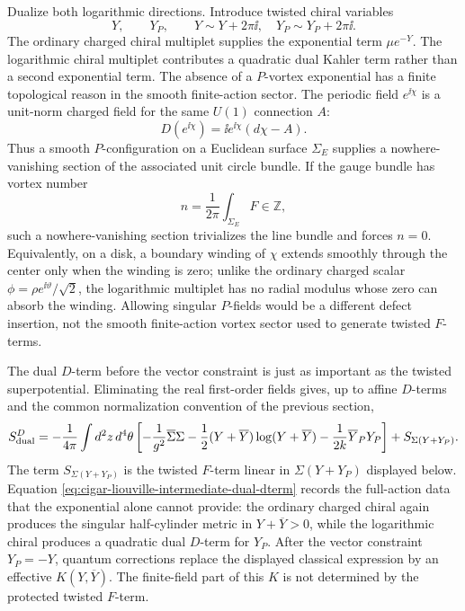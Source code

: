 Dualize both logarithmic directions.  Introduce twisted chiral variables
\[
  Y,\qquad Y_P,
  \qquad
  Y\sim Y+2\pi\ii,\quad Y_P\sim Y_P+2\pi\ii .
\]
The ordinary charged chiral multiplet supplies the exponential term
\(\mu e^{-Y}\).  The logarithmic chiral multiplet contributes a quadratic
dual Kahler term rather than a second exponential term.  The absence of a
\(P\)-vortex exponential has a finite topological reason in the smooth
finite-action sector.  The periodic field \(e^{\ii\chi}\) is a unit-norm
charged field for the same \(U(1)\) connection \(A\):
\[
  D(e^{\ii\chi})
  =
  \ii e^{\ii\chi}(d\chi-A).
\]
Thus a smooth \(P\)-configuration on a Euclidean surface \(\Sigma_E\)
supplies a nowhere-vanishing section of the associated unit circle bundle.
If the gauge bundle has vortex number
\[
  n=\frac{1}{2\pi}\int_{\Sigma_E}F\in\mathbb Z ,
\]
such a nowhere-vanishing section trivializes the line bundle and forces
\(n=0\).  Equivalently, on a disk, a boundary winding of \(\chi\) extends
smoothly through the center only when the winding is zero; unlike the
ordinary charged scalar \(\phi=\rho e^{\ii\vartheta}/\sqrt2\), the
logarithmic multiplet has no radial modulus whose zero can absorb the
winding.  Allowing singular \(P\)-fields would be a different defect
insertion, not the smooth finite-action vortex sector used to generate
twisted \(F\)-terms.

The dual \(D\)-term before the vector constraint is just as important as the
twisted superpotential.  Eliminating the real first-order fields gives, up to
affine \(D\)-terms and the common normalization convention of the previous
section,
\begin{equation}
  S_{\rm dual}^{D}
  =
  -\frac1{4\pi}
  \int d^2z\,d^4\theta
  \left[
  -\frac1{g^2}\overline\Sigma\Sigma
  -\frac12(Y+\overline Y)\log(Y+\overline Y)
  -\frac1{2k}\overline Y_PY_P
  \right]
  +
  S_{\Sigma(Y+Y_P)} .
  \label{eq:cigar-liouville-intermediate-dual-dterm}
\end{equation}
The term \(S_{\Sigma(Y+Y_P)}\) is the twisted \(F\)-term linear in
\(\Sigma(Y+Y_P)\) displayed below.  Equation
\eqref{eq:cigar-liouville-intermediate-dual-dterm} records the full-action
data that the exponential alone cannot provide: the ordinary charged chiral
again produces the singular half-cylinder metric in \(Y+\overline Y>0\), while
the logarithmic chiral produces a quadratic dual \(D\)-term for \(Y_P\).  After
the vector constraint \(Y_P=-Y\), quantum corrections replace the displayed
classical expression by an effective \(K(Y,\overline Y)\).  The finite-field
part of this \(K\) is not determined by the protected twisted \(F\)-term.

